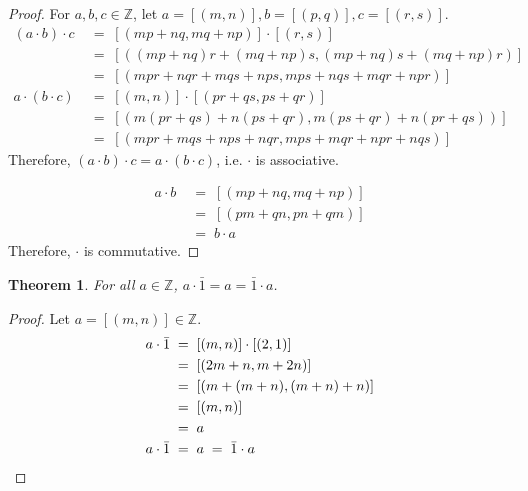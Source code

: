 \documentclass[10pt]{article}
\newtheorem{theorem}{Theorem}[section]
\theoremstyle{definition}
\theoremstyle{remark}
\begin{document}
\begin{proof}
                For $a,b,c \in \mathbb{Z}$, let $a = [(m, n)], b = [(p, q)], c = [(r, s)]$.
                \begin{align*}
                        (a\cdot b)\cdot c \;&=\; [(mp + nq, mq + np)] \cdot [(r, s)] \\
                                \;&=\; [((mp + nq)r + (mq + np)s, (mp + nq)s + (mq + np)r)]\\
                                \;&=\; [(mpr + nqr + mqs + nps, mps + nqs + mqr + npr)]\\
                        a\cdot (b\cdot c) \;&=\; [(m, n)] \cdot [(pr + qs, ps + qr)] \\
                                \;&=\; [(m(pr + qs) + n(ps + qr), m(ps + qr) + n(pr + qs))] \\
                                \;&=\; [(mpr + mqs + nps + nqr, mps + mqr + npr + nqs)]
                \end{align*}
                Therefore, $(a\cdot b)\cdot c = a\cdot (b\cdot c)$, i.e. $\cdot$ is associative.
                
                \begin{align*}
                        a\cdot b \;&=\; [(mp + nq, mq + np)] \\
                                \;&=\; [(pm + qn, pn + qm)] \\
                                \;&=\; b\cdot a
                \end{align*}
                Therefore, $\cdot$ is commutative.
        \end{proof}

        \begin{theorem}
                For all $a \in \mathbb{Z}$, $a\cdot\bar{1} = a = \bar{1}\cdot a$.
        \end{theorem}
        \begin{proof}
                Let $a = [(m, n)] \in \mathbb{Z}$.
                \begin{align*}
                        a\cdot \bar{1} \;&=\; [(m, n)] \cdot [(2, 1)] \\
                                \;&=\; [(2m + n, m + 2n)] \\
                                \;&=\; [(m + (m + n), (m + n) + n)] \\
                                \;&=\; [(m, n)] \\
                                \;&=\; a \\
                        a\cdot \bar{1} \;&=\; a \;=\; \bar{1}\cdot a \qedhere
                \end{align*}
        \end{proof}
\end{document}
